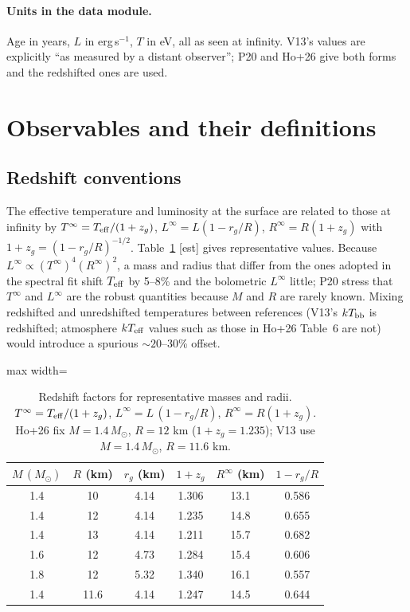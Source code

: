 \documentclass[11pt,a4paper]{article}
\newcommand{\src}[1]{\textsf{[#1]}}
\begin{document}
\paragraph{Units in the data module.} Age in years, $L$ in erg\,s$^{-1}$, $T$ in eV, all as seen at infinity. V13's values are explicitly ``as measured by a distant observer''; P20 and Ho+26 give both forms and the redshifted ones are used.

\section{Observables and their definitions}
\subsection{Redshift conventions}
The effective temperature and luminosity at the surface are related to those at infinity by $T^\infty=T_{\rm eff}/(1+z_g)$, $L^\infty=L(1-r_g/R)$, $R^\infty=R(1+z_g)$ with $1+z_g=(1-r_g/R)^{-1/2}$. Table~\ref{tab:red} \src{est} gives representative values. Because $L^\infty\propto (T^\infty)^4(R^\infty)^2$, a mass and radius that differ from the ones adopted in the spectral fit shift $T_{\rm eff}$ by 5--8\% and the bolometric $L^\infty$ little; P20 stress that $T^\infty$ and $L^\infty$ are the robust quantities because $M$ and $R$ are rarely known. Mixing redshifted and unredshifted temperatures between references (V13's $kT_{\rm bb}$ is redshifted; atmosphere $kT_{\rm eff}$ values such as those in Ho+26 Table~6 are not) would introduce a spurious $\sim20$--30\% offset.

\begin{table}[htbp]
\centering\small
\caption{Redshift factors for representative masses and radii. $T^\infty=T_{\rm eff}/(1+z_g)$, $L^\infty=L\,(1-r_g/R)$, $R^\infty=R(1+z_g)$. Ho+26 fix $M=1.4\,M_\odot$, $R=12$ km ($1+z_g=1.235$); V13 use $M=1.4\,M_\odot$, $R=11.6$ km.}\label{tab:red}
\begin{adjustbox}{max width=\textwidth}\begin{tabular}{cccccc}
\toprule
$M\,(M_\odot)$ & $R$ (km) & $r_g$ (km) & $1+z_g$ & $R^\infty$ (km) & $1-r_g/R$\\
\midrule
1.4 & 10 & 4.14 & 1.306 & 13.1 & 0.586\\
1.4 & 12 & 4.14 & 1.235 & 14.8 & 0.655\\
1.4 & 13 & 4.14 & 1.211 & 15.7 & 0.682\\
1.6 & 12 & 4.73 & 1.284 & 15.4 & 0.606\\
1.8 & 12 & 5.32 & 1.340 & 16.1 & 0.557\\
1.4 & 11.6 & 4.14 & 1.247 & 14.5 & 0.644\\
\bottomrule
\end{tabular}\end{adjustbox}
\end{table}
\end{document}

